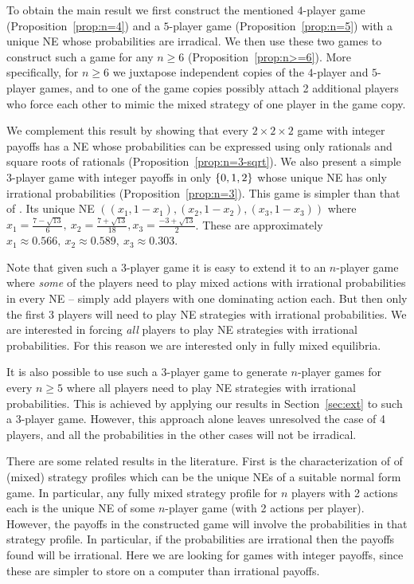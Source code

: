 \documentclass[preprint,12pt,authoryear]{elsarticle}
\DeclarePairedDelimiter{\ios}{\{}{\}}
\newcommand{\s}{\ios*}
\begin{document}
To obtain the main result we first construct the mentioned $4$-player game (Proposition~\ref{prop:n=4}) and 
a $5$-player game (Proposition~\ref{prop:n=5}) with a unique NE whose probabilities are 
irradical. We then use these two games to construct such a game for any $n\ge6$ 
(Proposition~\ref{prop:n>=6}). More specifically, for $n\ge6$ we juxtapose independent copies of 
the $4$-player and $5$-player games, and to one of the game copies possibly attach 2 
additional players who force each other to mimic the mixed strategy of one player in the game 
copy.

We complement this result by showing that every $2\times2\times2$ game with integer payoffs 
has a NE whose probabilities can be expressed using only rationals and square roots of 
rationals (Proposition~\ref{prop:n=3-sqrt}).
We also present a simple $3$-player game with integer payoffs in only $\s{0,1,2}$ whose 
unique NE has only irrational probabilities (Proposition~\ref{prop:n=3}). This game is 
simpler than that of \citet{bilo2014complexity}.
Its unique NE $((x_1,1-x_1),(x_2,1-x_2),(x_3,1-x_3))$ where
$x_1=\frac{7-\sqrt{13}}{6},~x_2=\frac{7+\sqrt{13}}{18},x_3=\frac{-3+\sqrt{13}}{2}$.
These are approximately $x_1\approx0.566,~x_2\approx0.589,~x_3\approx0.303$.

Note that given such a $3$-player game it is easy to extend it to an $n$-player game where 
\emph{some} of the players need to play mixed actions with irrational probabilities in 
every NE -- simply add players with one dominating action each. But then only the first 3 
players will need to play NE strategies with irrational probabilities. We are interested in 
forcing \emph{all} players to play NE strategies with irrational probabilities. For this 
reason we are interested only in fully mixed equilibria.

It is also possible to use such a $3$-player game to generate $n$-player games for every 
$n\ge5$ where all players need to play NE strategies with irrational probabilities. This is 
achieved by applying our results in Section~\ref{sec:ext} to such a $3$-player game.  
However, this approach alone leaves unresolved the case of 4 players, and all the probabilities in the other cases will not be irradical.

There are some related results in the literature. First is the characterization of 
\citet{kreps1981finite} of (mixed) strategy profiles which can be the unique NEs of a 
suitable normal form game. In particular, any fully mixed strategy profile for $n$ players 
with 2 actions each is the unique NE of some $n$-player game (with 2 actions per player).  
However, the payoffs in the constructed game will 
involve the probabilities in that strategy profile. In particular, if the probabilities are 
irrational then the payoffs found will be irrational. Here we are looking for games with 
integer payoffs, since these are simpler to store on a computer than irrational payoffs.
\end{document}
